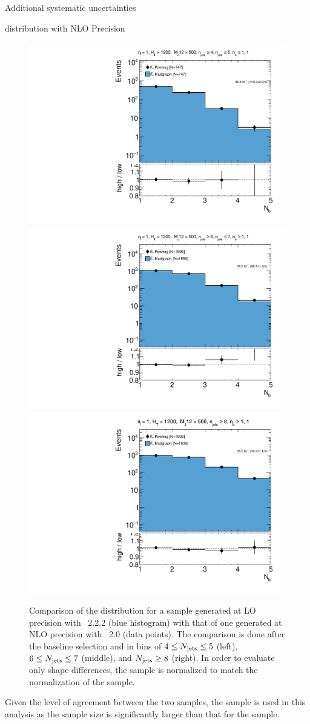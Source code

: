 \begin{section}{Additional systematic uncertainties}
\begin{subsection}{\Nb distribution with NLO Precision}
\begin{figure}[tbp!]
\begin{center}
\includegraphics[angle=0,width=0.30\columnwidth]{fig/nlo_comparison_lownjet.pdf}
\includegraphics[angle=0,width=0.30\columnwidth]{fig/nlo_comparison_mednjet.pdf}
\includegraphics[angle=0,width=0.30\columnwidth]{fig/nlo_comparison_highnjet.pdf}
\end{center}
\caption{Comparison of the \Nb distribution for a sample generated at LO precision with \MGatNLO~2.2.2 (blue histogram) with that of one generated at NLO precision with \POWHEG~2.0 (data points).
The comparison is done after the baseline selection and in bins of $4 \leq N_{\mathrm{jets}} \leq 5$ (left), $6 \leq N_{\mathrm{jets}} \leq 7$ (middle), and $N_{\mathrm{jets}} \geq 8$ (right).
In order to evaluate only shape differences, the \MGatNLO sample is normalized to match the normalization of the \POWHEG sample.}
\label{fig:nlo_nb_comparison}
\end{figure}

Given the level of agreement between the two samples, the \MGatNLO sample is used in this analysis as the sample size is significantly larger than that for the \POWHEG sample.

\end{subsection}

\end{section}

